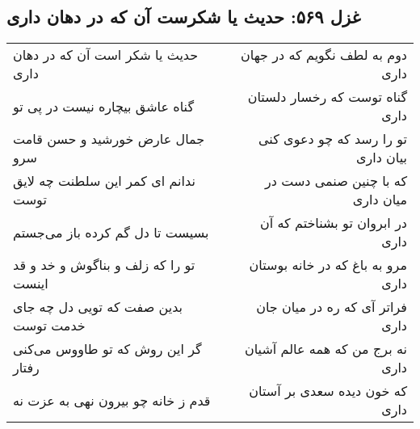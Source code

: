 \begin{center}
\section*{غزل ۵۶۹: حدیث یا شکرست آن که در دهان داری}
\label{sec:569}
\begin{longtable}{l p{0.5cm} r}
حدیث یا شکر است آن که در دهان داری
&&
دوم به لطف نگویم که در جهان داری
\\
گناه عاشق بیچاره نیست در پی تو
&&
گناه توست که رخسار دلستان داری
\\
جمال عارض خورشید و حسن قامت سرو
&&
تو را رسد که چو دعوی کنی بیان داری
\\
ندانم ای کمر این سلطنت چه لایق توست
&&
که با چنین صنمی دست در میان داری
\\
بسیست تا دل گم کرده باز می‌جستم
&&
در ابروان تو بشناختم که آن داری
\\
تو را که زلف و بناگوش و خد و قد اینست
&&
مرو به باغ که در خانه بوستان داری
\\
بدین صفت که تویی دل چه جای خدمت توست
&&
فراتر آی که ره در میان جان داری
\\
گر این روش که تو طاووس می‌کنی رفتار
&&
نه برج من که همه عالم آشیان داری
\\
قدم ز خانه چو بیرون نهی به عزت نه
&&
که خون دیده سعدی بر آستان داری
\\
\end{longtable}
\end{center}

